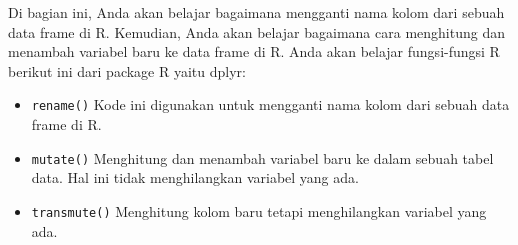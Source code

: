\documentclass[
]{book}
\providecommand{\tightlist}{%
  \setlength{\itemsep}{0pt}\setlength{\parskip}{0pt}}
\begin{document}
Di bagian ini, Anda akan belajar bagaimana mengganti nama kolom dari sebuah data frame di R. Kemudian, Anda akan belajar bagaimana cara menghitung dan menambah variabel baru ke data frame di R. Anda akan belajar fungsi-fungsi R berikut ini dari package R yaitu dplyr:

\begin{itemize}
\tightlist
\item
  \texttt{rename()} Kode ini digunakan untuk mengganti nama kolom dari sebuah data frame di R.
\item
  \texttt{mutate()} Menghitung dan menambah variabel baru ke dalam sebuah tabel data. Hal ini tidak menghilangkan variabel yang ada.
\item
  \texttt{transmute()} Menghitung kolom baru tetapi menghilangkan variabel yang ada.
\end{itemize}
\end{document}
